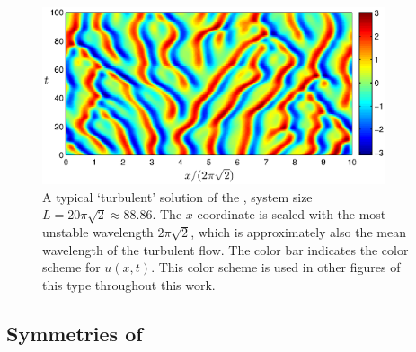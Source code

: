 \begin{figure}[t]
\begin{center}
\includegraphics[width=0.9\textwidth]{figs/ks_largeL_cbar.eps}
\end{center}
\caption{
A typical `turbulent' solution of the \KSe, system size
$L=20\pi\sqrt{2}\approx 88.86$.  The $x$ coordinate is scaled
with the most unstable wavelength $2\pi\sqrt{2}$, which is
approximately also the mean wavelength of the turbulent flow.
The color bar indicates the color scheme for $u(x,t)$.  This color
scheme is used in other figures of this type throughout this work.
     } \label{f:ks_largeL}
\end{figure}


\subsection{Symmetries of \KSe}
\label{sec:KSeSymm}

